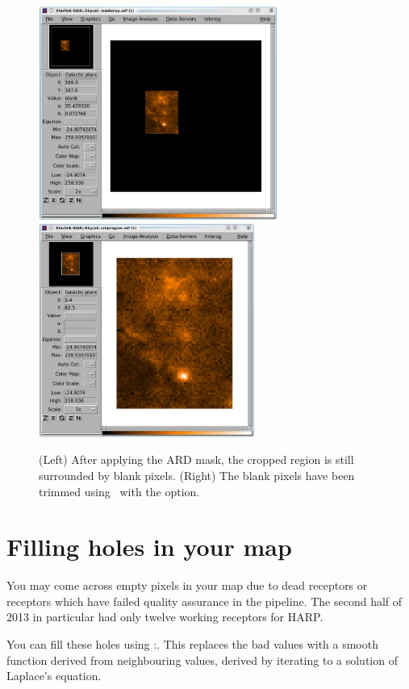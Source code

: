 \documentclass[11pt,oneside,chapters]{starlink}
\begin{document}
\begin{figure}[h!]
\begin{center}
\includegraphics[height=7cm]{sc20_ard5}
\hspace{0.3cm}
\includegraphics[height=7cm]{sc20_ard6}
\caption[Cropping a region of a two-dimensional map.]{\label{fig:crop}(Left) After
  applying the ARD mask, the cropped region is still surrounded by blank pixels.
  (Right) The blank pixels have been trimmed using \ndfcopy\ with the
   option.}
\label{fig:ardmask}
\end{center}
\end{figure}

\newpage
\section{Filling holes in your map}
\label{sec:holes}

You may come across empty pixels in your map due to dead receptors or
receptors which have failed quality assurance in the pipeline. The
second half of 2013 in particular had only twelve working receptors for
HARP.

You can fill these holes using \Kappa:\fillbad. This replaces the bad
values with a smooth function derived from neighbouring values,
derived by iterating to a solution of Laplace's equation.
\end{document}
